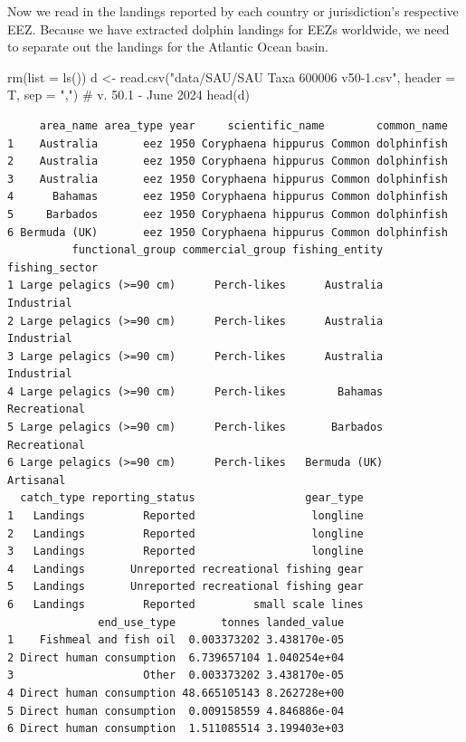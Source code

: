 \documentclass[
]{article}
\newenvironment{Shaded}{\begin{snugshade}}{\end{snugshade}}
\newcommand{\AttributeTok}[1]{\textcolor[rgb]{0.40,0.45,0.13}{#1}}
\newcommand{\CommentTok}[1]{\textcolor[rgb]{0.37,0.37,0.37}{#1}}
\newcommand{\FunctionTok}[1]{\textcolor[rgb]{0.28,0.35,0.67}{#1}}
\newcommand{\NormalTok}[1]{\textcolor[rgb]{0.00,0.23,0.31}{#1}}
\newcommand{\OtherTok}[1]{\textcolor[rgb]{0.00,0.23,0.31}{#1}}
\newcommand{\StringTok}[1]{\textcolor[rgb]{0.13,0.47,0.30}{#1}}
\begin{document}
Now we read in the landings reported by each country or jurisdiction's
respective EEZ. Because we have extracted dolphin landings for EEZs
worldwide, we need to separate out the landings for the Atlantic Ocean
basin.

\begin{Shaded}
\begin{Highlighting}[]
\FunctionTok{rm}\NormalTok{(}\AttributeTok{list =} \FunctionTok{ls}\NormalTok{())}
\NormalTok{d }\OtherTok{\textless{}{-}} \FunctionTok{read.csv}\NormalTok{(}\StringTok{"data/SAU/SAU Taxa 600006 v50{-}1.csv"}\NormalTok{, }\AttributeTok{header =}\NormalTok{ T, }\AttributeTok{sep =} \StringTok{","}\NormalTok{)  }\CommentTok{\# v. 50.1 {-} June 2024}
\FunctionTok{head}\NormalTok{(d)}
\end{Highlighting}
\end{Shaded}

\begin{verbatim}
     area_name area_type year     scientific_name        common_name
1    Australia       eez 1950 Coryphaena hippurus Common dolphinfish
2    Australia       eez 1950 Coryphaena hippurus Common dolphinfish
3    Australia       eez 1950 Coryphaena hippurus Common dolphinfish
4      Bahamas       eez 1950 Coryphaena hippurus Common dolphinfish
5     Barbados       eez 1950 Coryphaena hippurus Common dolphinfish
6 Bermuda (UK)       eez 1950 Coryphaena hippurus Common dolphinfish
          functional_group commercial_group fishing_entity fishing_sector
1 Large pelagics (>=90 cm)      Perch-likes      Australia     Industrial
2 Large pelagics (>=90 cm)      Perch-likes      Australia     Industrial
3 Large pelagics (>=90 cm)      Perch-likes      Australia     Industrial
4 Large pelagics (>=90 cm)      Perch-likes        Bahamas   Recreational
5 Large pelagics (>=90 cm)      Perch-likes       Barbados   Recreational
6 Large pelagics (>=90 cm)      Perch-likes   Bermuda (UK)      Artisanal
  catch_type reporting_status                 gear_type
1   Landings         Reported                  longline
2   Landings         Reported                  longline
3   Landings         Reported                  longline
4   Landings       Unreported recreational fishing gear
5   Landings       Unreported recreational fishing gear
6   Landings         Reported         small scale lines
              end_use_type       tonnes landed_value
1    Fishmeal and fish oil  0.003373202 3.438170e-05
2 Direct human consumption  6.739657104 1.040254e+04
3                    Other  0.003373202 3.438170e-05
4 Direct human consumption 48.665105143 8.262728e+00
5 Direct human consumption  0.009158559 4.846886e-04
6 Direct human consumption  1.511085514 3.199403e+03
\end{verbatim}
\end{document}
